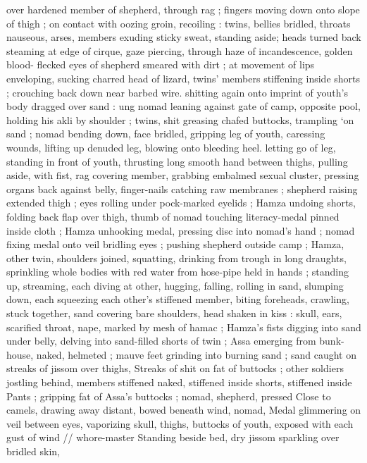 over hardened member of shepherd, through rag ; fingers moving 
down onto slope of thigh ; on contact with oozing groin, recoiling : 
twins, bellies bridled, throats nauseous, arses, members exuding 
sticky sweat, standing aside; heads turned back steaming at edge of 
cirque, gaze piercing, through haze of incandescence, golden blood- 
flecked eyes of shepherd smeared with dirt ; at movement of lips 
enveloping, sucking charred head of lizard, twins' members 
stiffening inside shorts ; crouching back down near barbed wire. 
shitting again onto imprint of youth's body dragged over sand : 
ung nomad leaning against gate of camp, opposite pool, holding 
his akli by shoulder ; twins, shit greasing chafed buttocks, trampling 
‘on sand ; nomad bending down, face bridled, gripping leg of youth, 
caressing wounds, lifting up denuded leg, blowing onto bleeding 
heel. letting go of leg, standing in front of youth, thrusting long 
smooth hand between thighs, pulling aside, with fist, rag covering 
member, grabbing embalmed sexual cluster, pressing organs back 
against belly, finger-nails catching raw membranes ; shepherd raising 
extended thigh ; eyes rolling under pock-marked eyelids ; Hamza 
undoing shorts, folding back flap over thigh, thumb of nomad 
touching literacy-medal pinned inside cloth ; Hamza unhooking 
medal, pressing disc into nomad's hand ; nomad fixing medal onto 
veil bridling eyes ; pushing shepherd outside camp ; Hamza, other 
twin, shoulders joined, squatting, drinking from trough in long 
draughts, sprinkling whole bodies with red water from hose-pipe held 
in hands ; standing up, streaming, each diving at other, hugging, 
falling, rolling in sand, slumping down, each squeezing each other's 
stiffened member, biting foreheads, crawling, stuck together, sand 
covering bare shoulders, head shaken in kiss : skull, ears, scarified 
throat, nape, marked by mesh of hamac ; Hamza's fists digging into 
sand under belly, delving into sand-filled shorts of twin ; Assa 
emerging from bunk-house, naked, helmeted ; mauve feet grinding 
into burning sand ; sand caught on streaks of jissom over thighs, 
Streaks of shit on fat of buttocks ; other soldiers jostling behind, 
members stiffened naked, stiffened inside shorts, stiffened inside 
Pants ; gripping fat of Assa's buttocks ; nomad, shepherd, pressed 
Close to camels, drawing away distant, bowed beneath wind, nomad, 
Medal glimmering on veil between eyes, vaporizing skull, thighs, 
buttocks of youth, exposed with each gust of wind {\slash}{\slash} whore-master 
Standing beside bed, dry jissom sparkling over bridled skin, 
